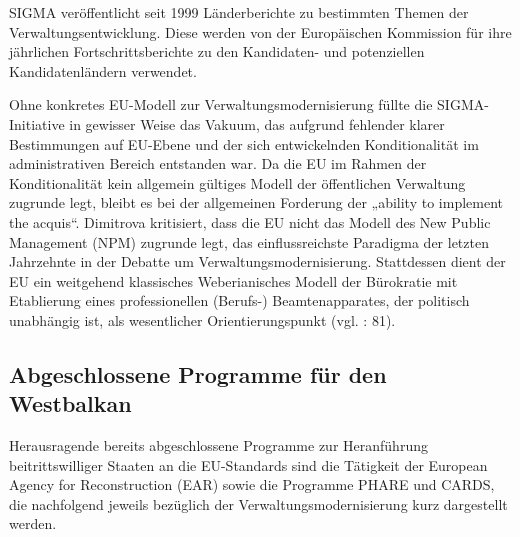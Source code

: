 SIGMA veröffentlicht seit 1999 Länderberichte zu bestimmten Themen der Verwaltungsentwicklung. Diese werden von der Europäischen Kommission für ihre jährlichen Fortschrittsberichte zu den Kandidaten- und potenziellen Kandidatenländern verwendet.\par
Ohne konkretes EU-Modell zur Verwaltungsmodernisierung füllte die SIGMA-Initiative in gewisser Weise das Vakuum, das aufgrund fehlender klarer Bestimmungen auf EU-Ebene und der sich entwickelnden Konditionalität im administrativen Bereich entstanden war. Da die EU im Rahmen der Konditionalität kein allgemein gültiges Modell der öffentlichen Verwaltung zugrunde legt, bleibt es bei der allgemeinen Forderung der „ability to implement the acquis“. Dimitrova kritisiert, dass die EU nicht das Modell des New Public Management (NPM) zugrunde legt, das einflussreichste Paradigma der letzten Jahrzehnte in der Debatte um Verwaltungsmodernisierung. Stattdessen dient der EU ein weitgehend klassisches Weberianisches Modell der Bürokratie mit Etablierung eines professionellen (Berufs-) Beamtenapparates, der politisch unabhängig ist, als wesentlicher Orientierungspunkt (vgl. \cite{dimit05}: 81).

\subsection{Abgeschlossene Programme für den Westbalkan}
Herausragende bereits abgeschlossene Programme zur Heranführung beitrittswilliger Staaten an die EU-Standards sind die Tätigkeit der European Agency for Reconstruction (EAR) sowie die Programme PHARE und CARDS, die nachfolgend jeweils bezüglich der Verwaltungsmodernisierung kurz dargestellt werden.

